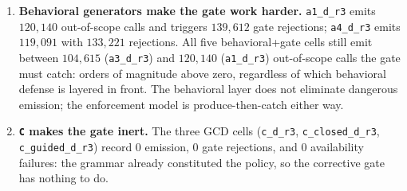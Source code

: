 \begin{enumerate}[leftmargin=2em,itemsep=2pt]
  \item \textbf{Behavioral generators make the gate work harder.} \texttt{a1\_d\_r3} emits \(120{,}140\) out-of-scope calls and triggers \(139{,}612\) gate rejections; \texttt{a4\_d\_r3} emits \(119{,}091\) with \(133{,}221\) rejections. All five behavioral+gate cells still emit between \(104{,}615\) (\texttt{a3\_d\_r3}) and \(120{,}140\) (\texttt{a1\_d\_r3}) out-of-scope calls the gate must catch: orders of magnitude above zero, regardless of which behavioral defense is layered in front. The behavioral layer does not eliminate dangerous emission; the enforcement model is produce-then-catch either way.
  \item \textbf{\texttt{C} makes the gate inert.} The three GCD cells (\texttt{c\_d\_r3}, \texttt{c\_closed\_d\_r3}, \texttt{c\_guided\_d\_r3}) record \(0\) emission, \(0\) gate rejections, and \(0\) availability failures: the grammar already constituted the policy, so the corrective gate has nothing to do.

\end{enumerate}
